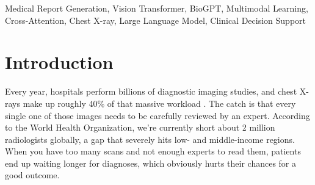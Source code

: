 \documentclass[conference]{IEEEtran}
\begin{document}
\begin{abstract}
The interpretation of medical imaging, particularly chest X-rays, is still a massive bottleneck for hospitals and clinics around the globe. With too few radiologists and a constantly growing number of scans to review, there's a real need for automated tools that can help doctors put together accurate, well-structured reports. In this study, we built a multimodal deep learning setup that links a specialized Vision Transformer (rad-dino, pre-trained specifically on radiological scans) with BioGPT, a biomedical language model. We connect them using a custom cross-attention fusion method. Simply put, our system takes a chest X-ray, looks at any provided patient history, and drafts a full radiology report complete with findings, impressions, and clinical recommendations. To make this actually usable in practice, we also developed a full web application using Flask that runs real-time inference on a GPU and can export professional PDFs right in the browser. When we tested the tool on 50 distinct X-rays from the IEEE-8023 COVID dataset, it managed a 100\% coherence rate—meaning it reliably wrote medically sound and properly structured text for everything from healthy lungs to severe COVID-19 or ARDS. Processing takes, on average, just about 8 seconds per image on a standard NVIDIA GPU. That kind of speed means it could realistically be deployed right at the point of care without slowing down the clinical workflow.
\end{abstract}

\begin{IEEEkeywords}
Medical Report Generation, Vision Transformer, BioGPT, Multimodal Learning, Cross-Attention, Chest X-ray, Large Language Model, Clinical Decision Support
\end{IEEEkeywords}

\section{Introduction}

Every year, hospitals perform billions of diagnostic imaging studies, and chest X-rays make up roughly 40\% of that massive workload \cite{wang2017chestxray8}. The catch is that every single one of those images needs to be carefully reviewed by an expert. According to the World Health Organization, we're currently short about 2 million radiologists globally, a gap that severely hits low- and middle-income regions. When you have too many scans and not enough experts to read them, patients end up waiting longer for diagnoses, which obviously hurts their chances for a good outcome.
\end{document}
